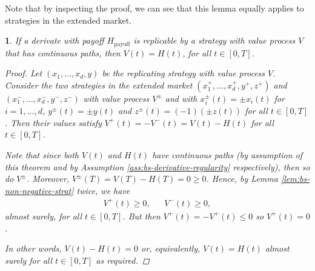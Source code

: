 \documentclass[english]{article}
\newcommand{\comment}[1]{\color{blue}#1\color{black}}
\numberwithin{equation}{section}
\numberwithin{figure}{section}
\theoremstyle{bolddescit}
\newtheorem{theorem}{\protect\theoremname}[section]
\theoremstyle{definition}
\theoremstyle{definition}
\theoremstyle{plain}
\theoremstyle{plain}
\theoremstyle{bolddesc}
\theoremstyle{plain}
\theoremstyle{remark}
\providecommand{\theoremname}{Theorem}
\begin{document}
Note that by inspecting the proof, we can see that this lemma equally applies to strategies in the extended market.

\begin{theorem}\label{thm:bs-repl-strat-derivative-prices}
  If a derivate with payoff $H_\text{payoff}$ is replicable by a strategy with value process $V$ that has continuous paths, then $V(t) = H(t)$, for all $t \in [0,T]$.

  \begin{proof}
    Let $(x_1,\ldots,x_d,y)$ be the replicating strategy with value process $V$. Consider the two strategies in the extended market $(x_1^+,\ldots,x_d^+,y^+,z^+)$ and $(x_1^-,\ldots,x_d^-,y^-,z^-)$ with value process $V^\pm$ and with $x_i^\pm(t) = \pm x_i(t)$ for $i=1,\ldots,d$, $y^\pm(t) = \pm y(t)$ and $z^\pm(t) = (-1) (\pm z(t))$ for all $t \in [0,T]$.  Then their values satisfy $V^+(t) = - V^-(t) = V(t) - H(t)$ for all $t \in [0,T]$.

    Note that since both $V(t)$ and $H(t)$ have continuous paths (by assumption of this theorem and by Assumption \ref{ass:bs-derivative-regularity} respectively), then so do $V^\pm$. Moreover, $V^\pm(T) = V(T) - H(T) = 0 \ge 0$. Hence, by Lemma \ref{lem:bs-non-negative-strat} twice, we have
    \begin{align*}
      V^+(t) \ge 0, && V^-(t) \ge 0,
    \end{align*}
    almost surely, for all $t \in [0,T]$. But then $V^+(t) = - V^+(t) \le 0$ so $V^+(t) = 0$.

    In other words, $V(t) - H(t) = 0$ or, equivalently, $V(t) = H(t)$ almost surely for all $t \in [0,T]$ as required.
  \end{proof}
\end{theorem}

\end{document}
